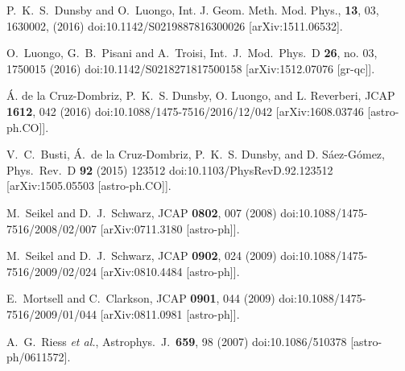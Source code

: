 \documentclass[nofootinbib,twocolumn]{revtex4}
\begin{document}
\begin{thebibliography}{99}
  P.~K.~S.~Dunsby and O.~Luongo,
   Int. J. Geom. Meth. Mod. Phys., {\bf 13}, 03, 1630002, (2016)
   doi:10.1142/S0219887816300026
   [arXiv:1511.06532].

  O.~Luongo, G.~B.~Pisani and A.~Troisi,
  Int.\ J.\ Mod.\ Phys.\ D {\bf 26}, no. 03, 1750015 (2016)
  doi:10.1142/S0218271817500158
  [arXiv:1512.07076 [gr-qc]].
  
    {\'A}. de la Cruz-Dombriz, P.~K.~S. Dunsby, O. Luongo, and L. Reverberi, 
    JCAP {\bf 1612}, 042 (2016)
    doi:10.1088/1475-7516/2016/12/042
    [arXiv:1608.03746 [astro-ph.CO]].
  


    V.~C.~Busti, {\'A}.~de la Cruz-Dombriz, P.~K.~S. Dunsby, and D. S{\'a}ez-G{\'o}mez, 
    Phys.\ Rev.\ D {\bf 92} (2015) 123512  
    doi:10.1103/PhysRevD.92.123512
    [arXiv:1505.05503 [astro-ph.CO]].

  
  M.~Seikel and D.~J.~Schwarz,
  JCAP {\bf 0802}, 007 (2008)
  doi:10.1088/1475-7516/2008/02/007
  [arXiv:0711.3180 [astro-ph]].

  M.~Seikel and D.~J.~Schwarz,
  JCAP {\bf 0902}, 024 (2009)
  doi:10.1088/1475-7516/2009/02/024
  [arXiv:0810.4484 [astro-ph]].


  E.~Mortsell and C.~Clarkson,
  JCAP {\bf 0901}, 044 (2009)
  doi:10.1088/1475-7516/2009/01/044
  [arXiv:0811.0981 [astro-ph]].


  A.~G.~Riess {\it et al.},
  Astrophys.\ J.\  {\bf 659}, 98 (2007)
  doi:10.1086/510378
  [astro-ph/0611572].




\end{thebibliography}
\end{document}
